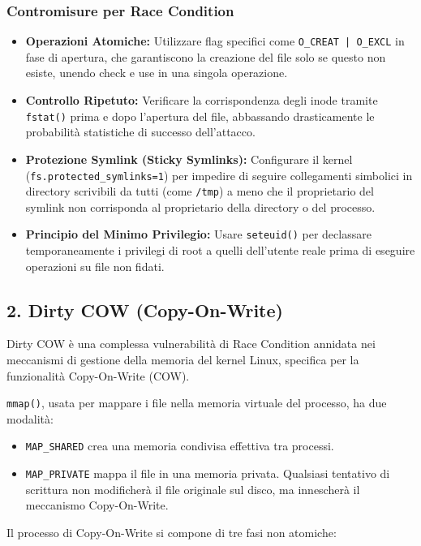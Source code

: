 \documentclass{article}
\begin{document}
\subsubsection{Contromisure per Race Condition}
\begin{itemize}
    \item \textbf{Operazioni Atomiche:} Utilizzare flag specifici come \texttt{O\_CREAT | O\_EXCL} in fase di apertura, che garantiscono la creazione del file solo se questo non esiste, unendo check e use in una singola operazione.
    \item \textbf{Controllo Ripetuto:} Verificare la corrispondenza degli inode tramite \texttt{fstat()} prima e dopo l'apertura del file, abbassando drasticamente le probabilità statistiche di successo dell'attacco.
    \item \textbf{Protezione Symlink (Sticky Symlinks):} Configurare il kernel (\texttt{fs.protected\_symlinks=1}) per impedire di seguire collegamenti simbolici in directory scrivibili da tutti (come \texttt{/tmp}) a meno che il proprietario del symlink non corrisponda al proprietario della directory o del processo.
    \item \textbf{Principio del Minimo Privilegio:} Usare \texttt{seteuid()} per declassare temporaneamente i privilegi di root a quelli dell'utente reale prima di eseguire operazioni su file non fidati.
\end{itemize}

\subsection{2. Dirty COW (Copy-On-Write)}
Dirty COW è una complessa vulnerabilità di Race Condition annidata nei meccanismi di gestione della memoria del kernel Linux, specifica per la funzionalità Copy-On-Write (COW).

\texttt{mmap()}, usata per mappare i file nella memoria virtuale del processo, ha due modalità:
\begin{itemize}
    \item \texttt{MAP\_SHARED} crea una memoria condivisa effettiva tra processi.
    \item \texttt{MAP\_PRIVATE} mappa il file in una memoria privata. Qualsiasi tentativo di scrittura non modificherà il file originale sul disco, ma innescherà il meccanismo Copy-On-Write.
\end{itemize}

Il processo di Copy-On-Write si compone di tre fasi non atomiche:
\end{document}
